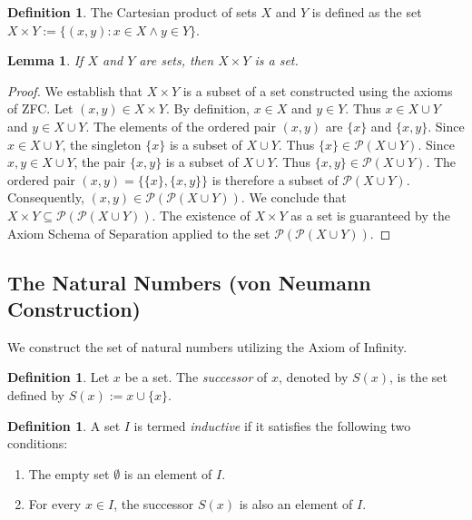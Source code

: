 \documentclass[11pt, a4paper]{article}
\theoremstyle{plain}
\newtheorem{lemma}[theorem]{Lemma}
\theoremstyle{definition}
\newtheorem{definition}[theorem]{Definition}
\numberwithin{equation}{section}
\newcommand{\powerset}{\mathcal{P}}
\begin{document}
\begin{definition}
The Cartesian product of sets $X$ and $Y$ is defined as the set $X \times Y := \{(x, y) : x \in X \land y \in Y\}$.
\end{definition}

\begin{lemma}
If $X$ and $Y$ are sets, then $X \times Y$ is a set.
\end{lemma}
\begin{proof}
We establish that $X \times Y$ is a subset of a set constructed using the axioms of ZFC.
Let $(x, y) \in X \times Y$. By definition, $x \in X$ and $y \in Y$. Thus $x \in X \cup Y$ and $y \in X \cup Y$.
The elements of the ordered pair $(x, y)$ are $\{x\}$ and $\{x, y\}$.
Since $x \in X \cup Y$, the singleton $\{x\}$ is a subset of $X \cup Y$. Thus $\{x\} \in \powerset(X \cup Y)$.
Since $x, y \in X \cup Y$, the pair $\{x, y\}$ is a subset of $X \cup Y$. Thus $\{x, y\} \in \powerset(X \cup Y)$.
The ordered pair $(x, y) = \{\{x\}, \{x, y\}\}$ is therefore a subset of $\powerset(X \cup Y)$.
Consequently, $(x, y) \in \powerset(\powerset(X \cup Y))$.
We conclude that $X \times Y \subseteq \powerset(\powerset(X \cup Y))$. The existence of $X \times Y$ as a set is guaranteed by the Axiom Schema of Separation applied to the set $\powerset(\powerset(X \cup Y))$.
\end{proof}

\subsection{The Natural Numbers (von Neumann Construction)}

We construct the set of natural numbers utilizing the Axiom of Infinity.

\begin{definition}
Let $x$ be a set. The \emph{successor} of $x$, denoted by $S(x)$, is the set defined by $S(x) := x \cup \{x\}$.
\end{definition}

\begin{definition}\label{def:inductive_set}
A set $I$ is termed \emph{inductive} if it satisfies the following two conditions:
\begin{enumerate}
    \item The empty set $\emptyset$ is an element of $I$.
    \item For every $x \in I$, the successor $S(x)$ is also an element of $I$.
\end{enumerate}
\end{definition}
\end{document}
